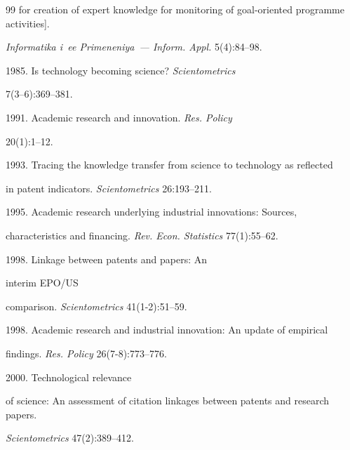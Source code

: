 {{\begin{thebibliography}{99}
for creation of expert knowledge for monitoring of goal-oriented programme activities]. 


\textit{Informatika i~ee Primeneniya~--- Inform. Appl.} 5(4):84--98.










 1985. Is technology becoming science? \textit{Scientometrics} 


7(3--6):369--381.




 1991. Academic research and innovation. \textit{Res. Policy}  


20(1):1--12.




 1993. Tracing the knowledge transfer from science to technology as reflected 


in patent indicators. \textit{Scientometrics} 26:193--211.




 1995. Academic research underlying industrial innovations: Sources, 


characteristics and financing. \textit{Rev. Econ. Statistics} 77(1):55--62.




 1998. Linkage between patents and papers: An


 interim EPO\!/\!US 


comparison. \textit{Scientometrics} 41(1-2):51--59.




 1998. Academic research and industrial innovation: An update of empirical 


findings. \textit{Res. Policy} 26(7-8):773--776.




 2000. Technological relevance 


of science: An assessment of citation linkages between patents and research papers. 


\textit{Scientometrics} 47(2):389--412.







\end{thebibliography}}}
